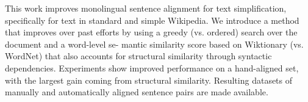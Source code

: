 This work improves monolingual sentence alignment for text simplification, specifically for text in standard and simple Wikipedia. We introduce a method that improves over past efforts by using a greedy (vs. ordered) search over the document and a word-level se- mantic similarity score based on Wiktionary (vs. WordNet) that also accounts for structural similarity through syntactic dependencies. Experiments show improved performance on a hand-aligned set, with the largest gain coming from structural similarity. Resulting datasets of manually and automatically aligned sentence pairs are made available.
